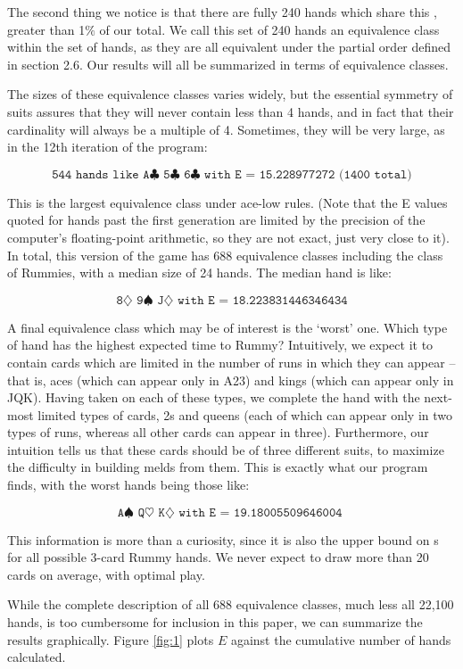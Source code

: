 \documentclass[letter,12pt]{article}
\begin{document}
The second thing we notice is that there are fully 240 hands which share this , greater than 1$\%$ of our total. We call this set of 240 hands an equivalence class within the set of hands, as they are all equivalent under the partial order defined in section 2.6. Our results will all be summarized in terms of equivalence classes. 

The sizes of these equivalence classes varies widely, but the essential symmetry of suits assures that they will never contain less than 4 hands, and in fact that their cardinality will always be a multiple of 4. Sometimes, they will be very large, as in the 12th iteration of the program: 

$$\texttt{544 hands like A$\clubsuit$ 5$\clubsuit$ 6$\clubsuit$ with E = 15.228977272 (1400 total)}$$ 

This is the largest equivalence class under ace-low rules. (Note that the E values quoted for hands past the first generation are limited by the precision of the computer’s floating-point arithmetic, so they are not exact, just very close to it). In total, this version of the game has 688 equivalence classes including the class of Rummies, with a median size of 24 hands. The median hand is like: 

$$\texttt{8$\diamondsuit$ 9$\spadesuit$ J$\diamondsuit$ with E = 18.223831446346434}$$

A final equivalence class which may be of interest is the ‘worst’ one. Which type of hand has the highest expected time to Rummy?  Intuitively, we expect it to contain cards which are limited in the number of runs in which they can appear – that is, aces (which can appear only in A23) and kings (which can appear only in JQK). Having taken on each of these types, we complete the hand with the next-most limited types of cards, 2s and queens (each of which can appear only in two types of runs, whereas all other cards can appear in three). Furthermore, our intuition tells us that these cards should be of three different suits, to maximize the difficulty in building melds from them. This is exactly what our program finds, with the worst hands being those like: 

$$\texttt{A$\spadesuit$ Q$\heartsuit$  K$\diamondsuit$ with E = 19.18005509646004 }$$

This information is more than a curiosity, since it is also the upper bound on s for all possible 3-card Rummy hands. We never expect to draw more than 20 cards on average, with optimal play. 

While the complete description of all 688 equivalence classes, much less all 22,100 hands, is too cumbersome for inclusion in this paper, we can summarize the results graphically. Figure \ref{fig:1} plots $E$ against the cumulative number of hands calculated.
\end{document}
